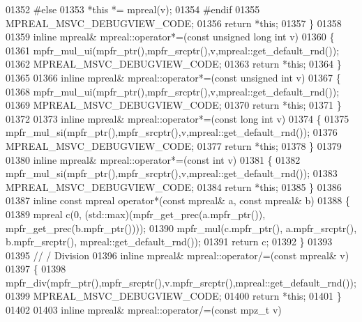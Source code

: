 \begin{DoxyCode}
01352 \textcolor{preprocessor}{#else}
01353     *\textcolor{keyword}{this} *= mpreal(v);
01354 \textcolor{preprocessor}{#endif}
01355     MPREAL\_MSVC\_DEBUGVIEW\_CODE;
01356     \textcolor{keywordflow}{return} *\textcolor{keyword}{this};
01357 \}
01358 
01359 \textcolor{keyword}{inline} mpreal& mpreal::operator*=(\textcolor{keyword}{const} \textcolor{keywordtype}{unsigned} \textcolor{keywordtype}{long} \textcolor{keywordtype}{int} v)
01360 \{
01361     mpfr\_mul\_ui(mpfr\_ptr(),mpfr\_srcptr(),v,mpreal::get\_default\_rnd());
01362     MPREAL\_MSVC\_DEBUGVIEW\_CODE;
01363     \textcolor{keywordflow}{return} *\textcolor{keyword}{this};
01364 \}
01365 
01366 \textcolor{keyword}{inline} mpreal& mpreal::operator*=(\textcolor{keyword}{const} \textcolor{keywordtype}{unsigned} \textcolor{keywordtype}{int} v)
01367 \{
01368     mpfr\_mul\_ui(mpfr\_ptr(),mpfr\_srcptr(),v,mpreal::get\_default\_rnd());
01369     MPREAL\_MSVC\_DEBUGVIEW\_CODE;
01370     \textcolor{keywordflow}{return} *\textcolor{keyword}{this};
01371 \}
01372 
01373 \textcolor{keyword}{inline} mpreal& mpreal::operator*=(\textcolor{keyword}{const} \textcolor{keywordtype}{long} \textcolor{keywordtype}{int} v)
01374 \{
01375     mpfr\_mul\_si(mpfr\_ptr(),mpfr\_srcptr(),v,mpreal::get\_default\_rnd());
01376     MPREAL\_MSVC\_DEBUGVIEW\_CODE;
01377     \textcolor{keywordflow}{return} *\textcolor{keyword}{this};
01378 \}
01379 
01380 \textcolor{keyword}{inline} mpreal& mpreal::operator*=(\textcolor{keyword}{const} \textcolor{keywordtype}{int} v)
01381 \{
01382     mpfr\_mul\_si(mpfr\_ptr(),mpfr\_srcptr(),v,mpreal::get\_default\_rnd());
01383     MPREAL\_MSVC\_DEBUGVIEW\_CODE;
01384     \textcolor{keywordflow}{return} *\textcolor{keyword}{this};
01385 \}
01386 
01387 \textcolor{keyword}{inline} \textcolor{keyword}{const} mpreal operator*(\textcolor{keyword}{const} mpreal& a, \textcolor{keyword}{const} mpreal& b)
01388 \{
01389   mpreal c(0, (std::max)(mpfr\_get\_prec(a.mpfr\_ptr()), mpfr\_get\_prec(b.mpfr\_ptr())));
01390   mpfr\_mul(c.mpfr\_ptr(), a.mpfr\_srcptr(), b.mpfr\_srcptr(), mpreal::get\_default\_rnd());
01391   \textcolor{keywordflow}{return} c;
01392 \}
01393 
01395 \textcolor{comment}{// / Division}
01396 \textcolor{keyword}{inline} mpreal& mpreal::operator/=(\textcolor{keyword}{const} mpreal& v)
01397 \{
01398     mpfr\_div(mpfr\_ptr(),mpfr\_srcptr(),v.mpfr\_srcptr(),mpreal::get\_default\_rnd());
01399     MPREAL\_MSVC\_DEBUGVIEW\_CODE;
01400     \textcolor{keywordflow}{return} *\textcolor{keyword}{this};
01401 \}
01402 
01403 \textcolor{keyword}{inline} mpreal& mpreal::operator/=(\textcolor{keyword}{const} mpz\_t v)

\end{DoxyCode}
